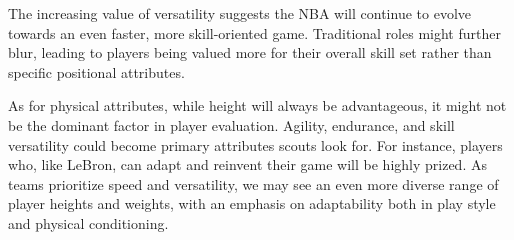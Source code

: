 \documentclass[
]{book}
\begin{document}
The increasing value of versatility suggests the NBA will continue to evolve towards an even faster, more skill-oriented game. Traditional roles might further blur, leading to players being valued more for their overall skill set rather than specific positional attributes.

As for physical attributes, while height will always be advantageous, it might not be the dominant factor in player evaluation. Agility, endurance, and skill versatility could become primary attributes scouts look for. For instance, players who, like LeBron, can adapt and reinvent their game will be highly prized. As teams prioritize speed and versatility, we may see an even more diverse range of player heights and weights, with an emphasis on adaptability both in play style and physical conditioning.

  
\end{document}
